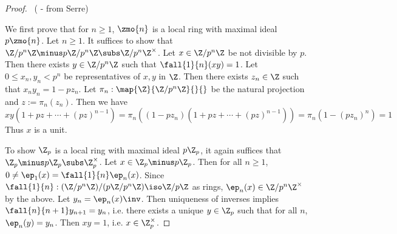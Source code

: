 \begin{proof}~( - from Serre)

  We first prove that for $n \geq 1$, 
  $\zmo{n}$ is a local ring with maximal ideal $p\zmo{n}$.
  Let $n \geq 1$. 
  It suffices to show that $\Z/p^n\Z \minus p\Z/p^n\Z \subs \Z/p^n\Z^\times$. 
  Let $x \in \Z/p^n\Z$ be not divisible by $p$. 
  Then there exists $y \in \Z/p^n\Z$ such that $\fall{1}{n} (x y) = 1$.
  Let $0 \leq x_n, y_n < p^n$ be representatives of $x, y$ in $\Z$. 
  Then there exists $z_n \in \Z$ such that $x_n y_n = 1 - p z_n$. 
  Let $\pi_n : \map{\Z}{\Z/p^n\Z}{}{}$ be the natural projection and 
  $z := \pi_n(z_n)$. 
  Then we have \[
    x y (1 + p z + \cdots + (pz)^{n-1})
    = \pi_n((1 - p z_n)(1 + p z + \cdots + (pz)^{n-1}))
    = \pi_n(1 - (p z_n)^n)
    = 1 
  \]
  Thus $x$ is a unit. 

  To show $\Z_p$ is a local ring with maximal ideal $p\Z_p$, 
  it again suffices that $\Z_p\minus p\Z_p \subs \Z_p^\times$. 
  Let $x \in \Z_p\minus p\Z_p$. 
  Then for all $n \geq 1$, $0 \neq \ep_1(x) = \fall{1}{n}\ep_n(x)$. 
  Since $\fall{1}{n} : (\Z/p^n\Z) / (p\Z/p^n\Z) \iso \Z/p\Z$ as rings, 
  $\ep_n(x) \in \Z/p^n\Z^\times$ by the above. 
  Let $y_n = \ep_n(x)\inv$. 
  Then uniqueness of inverses implies $\fall{n}{n+1} y_{n+1} = y_n$,
  i.e. there exists a unique $y \in \Z_p$ such that 
  for all $n$, $\ep_n(y) = y_n$.
  Then $x y = 1$, i.e. $x \in \Z_p^\times$. 
\end{proof}